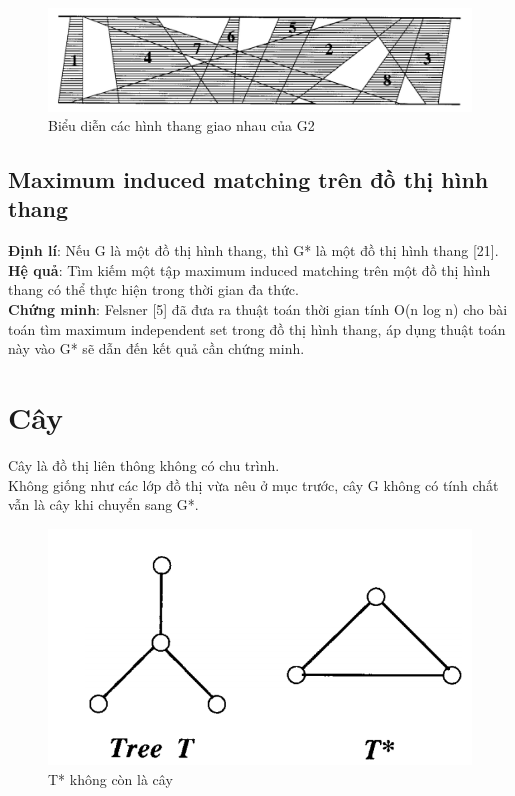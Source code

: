 \documentclass[14pt,a4paper]{extreport}
\begin{document}
\begin{figure}
	\centering
	\includegraphics[scale=.5]{trapezoid2}
	\caption{Biểu diễn các hình thang giao nhau của G2}
\end{figure}

\section{Maximum induced matching trên đồ thị hình thang}

\textbf{Định lí}: Nếu G là một đồ thị hình thang, thì G* là một đồ thị hình thang [21].\\
\textbf{Hệ quả}: Tìm kiếm một tập maximum induced matching trên một đồ thị hình thang có thể thực hiện trong thời gian đa thức.\\
\textbf{Chứng minh}: Felsner [5] đã đưa ra thuật toán thời gian tính O(n log n) cho bài toán tìm maximum independent set trong đồ thị hình thang, áp dụng thuật toán này vào G* sẽ dẫn đến kết quả cần chứng minh.

\chapter{Cây}
Cây là đồ thị liên thông không có chu trình.\\
Không giống như các lớp đồ thị vừa nêu ở mục trước, cây G không có tính chất vẫn là cây khi chuyển sang G*. 

\begin{figure}
	\centering
	\includegraphics[scale=.5]{tree}
	\caption{T* không còn là cây}
\end{figure}
\end{document}
